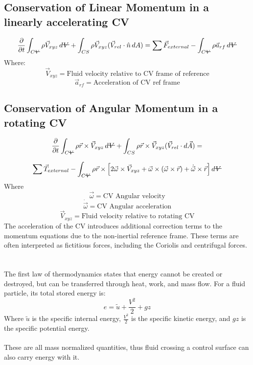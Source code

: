 ﻿\documentclass[12pt]{article}
\newcommand{\vol}{\mathord{\text{\ooalign{\hidewidth $V$\hidewidth\cr\kern-0.5pt\raisebox{0.8ex}{\rule[0pt]{1em}{0.5pt}}}}}}
\begin{document}
\subsection*{Conservation of Linear Momentum in a linearly accelerating CV}
\[
\frac{\partial}{\partial t}\int_{C\vol}\rho\vec{V}_{xyz}\,d\vol
+\int_{CS}\rho\vec{V}_{xyz}(\vec{V}_{rel}\cdot\hat{n}\,dA)
=\sum\vec{F}_{external}-\int_{C\vol}\rho\vec{a}_{rf}\,d\vol
\]
Where:
\[
\vec{V}_{xyz}=\text{Fluid velocity relative to CV frame of reference}
\]
\[
\vec{a}_{rf}=\text{Acceleration of CV ref frame}
\]
\subsection*{Conservation of Angular Momentum in a rotating CV}

\[
\frac{\partial}{\partial t}\int_{C\vol}\rho\vec{r}\times\vec{V}_{xyz}\,d\vol
+\int_{CS}\rho\vec{r}\times\vec{V}_{xyz}(\vec{V}_{rel}\cdot d\vec{A})
=
\]

\[
\sum\vec{T}_{external}
-\int_{C\vol}\rho\vec{r}\times
\left[
2\vec{\omega}\times\vec{V}_{xyz}
+\vec{\omega}\times(\vec{\omega}\times\vec{r})
+\dot{\vec{\omega}}\times\vec{r}
\right]d\vol
\]
Where
\[
\vec{\omega}=\text{CV Angular velocity}
\]
\[
\dot{\vec{\omega}}=\text{CV Angular acceleration}
\]
\[
\vec{V}_{xyz}=\text{Fluid velocity relative to rotating CV}
\]
The acceleration of the CV introduces additional correction terms to the momentum equations due to the non-inertial reference frame. These terms are often interpreted as fictitious forces, including the Coriolis and centrifugal forces.
\section*{}
The first law of thermodynamics states that energy cannot be created or destroyed, but can be transferred through heat, work, and mass flow. For a fluid particle, its total stored energy is:
\[
\boxed{e=\tilde{u}+\frac{V^2}{2}+gz}
\]
Where ${\tilde{u}}$ is the specific internal energy, $\frac{V^2}{2}$ is the specific kinetic energy, and $gz$ is the specific potential energy.\\\\
These are all mass normalized quantities, thus fluid crossing a control surface can also carry energy with it.
\end{document}
